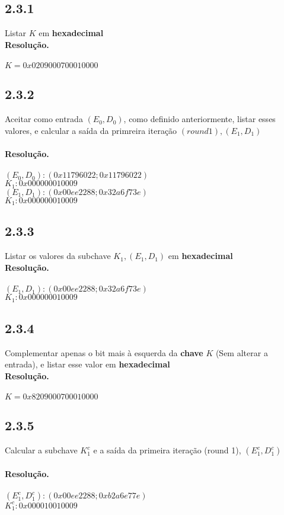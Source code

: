 \documentclass[12pt,letterpaper]{article}
\newcommand\answer{\textbf{Resolução.}\xspace}
\begin{document}
\subsection*{2.3.1}
Listar $K$ em \textbf{hexadecimal} \\ 
\answer \\ \\
$K = 0x0209000700010000$

\subsection*{2.3.2}
Aceitar como entrada $(E_0, D_0)$, como definido anteriormente, listar esses valores, e calcular a saída da primreira iteração $(round 1),(E_1, D_1)$ \\ \\ 
\answer \\ \\
$(E_0, D_0): (0x11796022; 0x11796022)$ \\
$K_1  : 0x000000010009$ \\
$(E_1, D_1): (0x00ee2288; 0x32a6f73e)$ \\
$K_1  : 0x000000010009$

\subsection*{2.3.3}
Listar os valores da subchave $K_1, (E_1, D_1)$ em \textbf{hexadecimal} \\
\answer \\ \\
$(E_1, D_1): (0x00ee2288; 0x32a6f73e)$ \\
$K_1  : 0x000000010009$

\subsection*{2.3.4}
Complementar apenas o bit mais à esquerda da \textbf{chave} $K$ (Sem alterar a entrada), e listar esse valor em \textbf{hexadecimal} \\ 
\answer \\ \\
$K = 0x8209000700010000$

\subsection*{2.3.5}
Calcular a subchave $K_1^c$ e a saída da primeira iteração (round 1), $(E_1^c, D_1^c)$ \\ \\
\answer \\ \\
$(E_1^c, D_1^c): (0x00ee2288; 0xb2a6e77e)$ \\
$K_1^c  : 0x000010010009$
\end{document}
